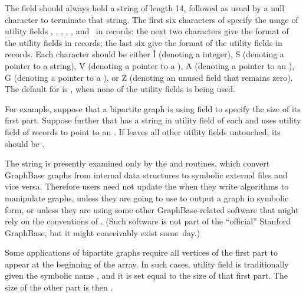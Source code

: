 The  field should always hold a string of length 14,
followed
as usual by a null character to terminate that string. The first six
characters of  specify the usage of utility fields , ,
, , , and~ in  records; the next
two characters give the
format of the utility fields in  records; the last six give the
format of the utility fields in  records.  Each character
should be either \.I (denoting a  integer),
\.S (denoting a pointer to a string),
\.V (denoting a pointer to a ), \.A (denoting a pointer to an
), \.G (denoting a pointer to a ), or \.Z (denoting
an
unused field that remains zero). The default for  is
, when none of the utility fields is being used.

For example, suppose that a bipartite graph  is using field 
to specify the size of its first part. Suppose further that  has a
string in utility field  of each  and uses
utility field  of  records to point to an .
If 
leaves all other utility fields untouched, its  should be
.

The  string is presently examined only by the  and
 routines, which convert GraphBase graphs from internal
data structures to symbolic external files and vice versa. Therefore
users need not update the  when they write algorithms to
manipulate graphs, unless they are going to use  to output
a graph in symbolic form, or unless they are using some other
GraphBase-related software that might rely on the conventions of
.  (Such software is not part of the ``official'' Stanford
GraphBase, but it might conceivably exist some~day.)

\fi

Some applications of bipartite graphs require all vertices of the first
part to appear at the beginning of the  array. In such cases,
utility field  is traditionally given the symbolic name , and
it is set equal to the size of that first part. The size of the other
part is then .

